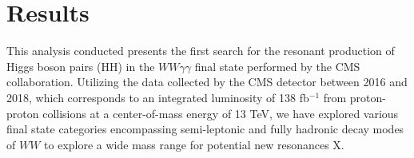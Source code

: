 \section{Results}
\label{sec:results}

This analysis conducted presents the first search for the resonant production
of Higgs boson pairs (HH) in
the $WW\gamma\gamma$ final state performed by the CMS collaboration.
Utilizing the data collected by the CMS detector between 2016 and 2018, which
corresponds to an integrated luminosity of 138 fb$^{-1}$ from proton-proton
collisions at a center-of-mass energy of 13 TeV, we have explored various final
state categories encompassing semi-leptonic and fully hadronic decay modes of
$WW$ to explore a wide mass range for potential new resonances X.



